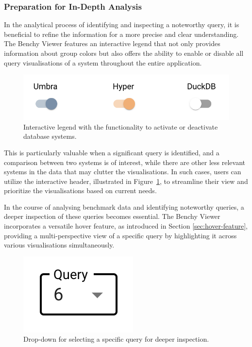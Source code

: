 \subsubsection{Preparation for In-Depth Analysis}

In the analytical process of identifying and inspecting a noteworthy query, it is beneficial to refine the information for a more precise and clear understanding.\\
The Benchy Viewer features an interactive legend that not only provides information about group colors but also offers the ability to enable or disable all query visualisations of a system throughout the entire application.

\begin{figure}[h]
  \centering
  \includegraphics[width=0.4\linewidth]{figures/legend-activate-deactivate.png}
  \caption{Interactive legend with the functionality to activate or deactivate database systems.}
  \label{fig:legend-activate-deactivate}
\end{figure}

This is particularly valuable when a significant query is identified, and a comparison between two systems is of interest, while there are other less relevant systems in the data that may clutter the visualisations. In such cases, users can utilize the interactive header, illustrated in Figure~\ref{fig:legend-activate-deactivate}, to streamline their view and prioritize the visualisations based on current needs.

In the course of analysing benchmark data and identifying noteworthy queries, a deeper inspection of these queries becomes essential. The Benchy Viewer incorporates a versatile hover feature, as introduced in Section \ref{sec:hover-feature}, providing a multi-perspective view of a specific query by highlighting it across various visualisations simultaneously.

\begin{figure}[h]
  \centering
  \includegraphics[width=0.15\linewidth]{figures/select-query.png}
  \caption{Drop-down for selecting a specific query for deeper inspection.}
  \label{fig:select-query}
\end{figure}

